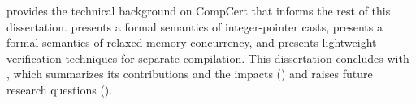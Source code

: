  provides the technical background on CompCert that informs the rest of this
dissertation.   presents a formal semantics of integer-pointer casts,
 presents a formal semantics of relaxed-memory concurrency, and
 presents lightweight verification techniques for separate compilation.  This
dissertation concludes with , which summarizes its contributions and the impacts
() and raises future research questions ().


